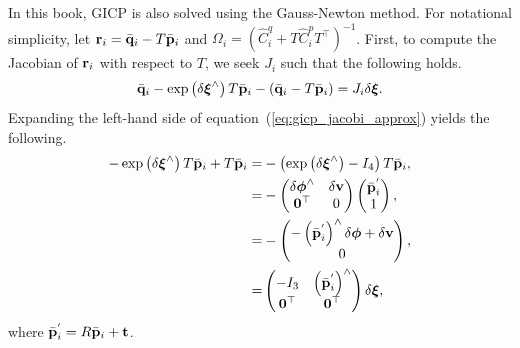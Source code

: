 In this book, GICP is also solved using the Gauss-Newton method.
For notational simplicity, let ${\bf r}_{i} = \bar{ {\bf q} }_{i} - T \bar{ {\bf p} }_{i}$ and $\Omega_{i} = \left( \hat{C}_{i}^{q} + T \hat{C}_{i}^{p} T^{\top} \right)^{-1}$.
First, to compute the Jacobian of ${\bf r}_{i}$ with respect to $T$, we seek $J_{i}$ such that the following holds.
%
\begin{align}
  \bar{ {\bf q} }_{i} - \exp \left( \delta \boldsymbol \xi^{\wedge} \right) T \bar{ {\bf p} }_{i} - \left( \bar{ {\bf q} }_{i} - T \bar{ {\bf p} }_{i} \right) = J_{i} \delta \boldsymbol \xi.
  \label{eq:gicp_jacobi_approx}
\end{align}
%
Expanding the left-hand side of equation~(\ref{eq:gicp_jacobi_approx}) yields the following.
%
\begin{align}
  \begin{split}
    -\exp \left( \delta \boldsymbol \xi^{\wedge} \right) T \bar{ {\bf p} }_{i} + T \bar{ {\bf p} }_{i}
%
    = & - \left( \exp \left( \delta \boldsymbol \xi^{\wedge} \right) - I_{4} \right) T \bar{ {\bf p} }_{i}, \\
%
    = & - \left( \begin{matrix}
            \delta \boldsymbol \phi^{\wedge} & \delta {\bf v} \\
            {\bf 0}^{\top}                   & 0
          \end{matrix} \right)
          \left( \begin{matrix}
            \bar{ {\bf p} }_{i}^{'} \\
            1
          \end{matrix} \right), \\
%
    = & - \left( \begin{matrix}
            - \left( \bar{ {\bf p} }_{i}^{'} \right)^{\wedge} \delta \boldsymbol \phi + \delta {\bf v} \\
            0
          \end{matrix} \right), \\
%
    = & \left( \begin{matrix}
          -I_{3}         & \left( \bar{ {\bf p} }_{i}^{'} \right)^{\wedge} \\
          {\bf 0}^{\top} & {\bf 0}^{\top}
        \end{matrix} \right) \delta \boldsymbol \xi, \\
  \end{split}
\end{align}
%
where $\bar{ {\bf p} }_{i}^{'} = R \bar{ {\bf p} }_{i} + {\bf t}$.
